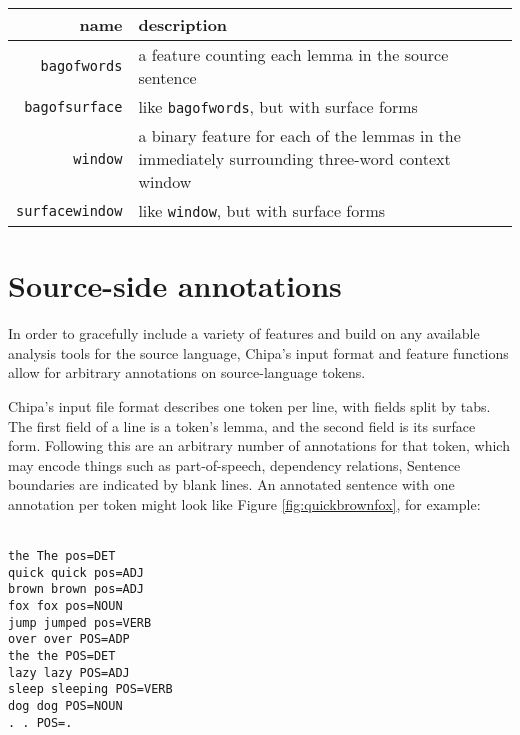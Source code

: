 
\begin{figure*}
  \begin{centering}
  \begin{tabular}{|r|p{11cm}|}
    \hline
    name          & description  \\
    \hline
    \texttt{bagofwords}    & a feature counting each lemma in the source sentence \\
    \hline
    \texttt{bagofsurface}  & like \texttt{bagofwords}, but with surface forms \\
    \hline
    \texttt{window}       & a binary feature for each of the lemmas in the immediately surrounding three-word context window \\
    \hline
    \texttt{surfacewindow} & like \texttt{window}, but with surface forms \\
    \hline
  \end{tabular}
  \end{centering}
  \caption{Features for the baseline Chipa system}
  \label{fig:baselinefeatures}
\end{figure*}

\section{Source-side annotations}
\label{sec:annotations}
In order to gracefully include a variety of features and build on
any available analysis tools for the source language, Chipa's input format and
feature functions allow for arbitrary annotations on source-language tokens.

Chipa's input file format describes one token per line, with fields split by
tabs.  The first field of a line is a token's lemma, and the second field is
its surface form.  Following this are an arbitrary number of annotations for
that token, which may encode things such as part-of-speech, dependency
relations, Sentence boundaries are indicated by blank lines. An annotated
sentence with one annotation per token might look like Figure
\ref{fig:quickbrownfox}, for example:

\begin{figure*}
\raggedright \texttt{\\
the	The	pos=DET \\
quick	quick	pos=ADJ \\
brown	brown	pos=ADJ \\
fox	fox	pos=NOUN \\
jump	jumped	pos=VERB \\
over	over	POS=ADP \\
the	the	POS=DET \\
lazy	lazy	POS=ADJ \\
sleep sleeping	POS=VERB \\
dog	dog	POS=NOUN \\
.	.	POS=. \\
  }
  \caption{Example annotated sentence.}
  \label{fig:quickbrownfox}
\end{figure*}


